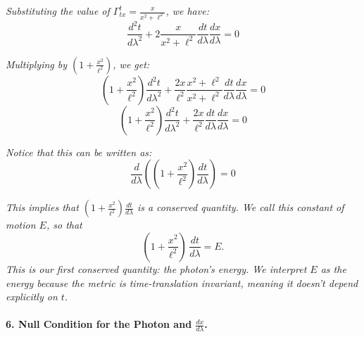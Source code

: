 \textit{Substituting the value of \(\Gamma^t_{tx} = \frac{x}{x^2 + \ell^2}\), we have:}
\[
\frac{d^2t}{d\lambda^2} + 2\frac{x}{x^2 + \ell^2} \frac{dt}{d\lambda} \frac{dx}{d\lambda} = 0
\]

\textit{Multiplying by \((1 + \frac{x^2}{\ell^2})\), we get:}
\[
(1 + \frac{x^2}{\ell^2}) \frac{d^2t}{d\lambda^2} + \frac{2x}{\ell^2} \frac{x^2 + \ell^2}{x^2+\ell^2} \frac{dt}{d\lambda} \frac{dx}{d\lambda} = 0
\]
\[
\left(1 + \frac{x^2}{\ell^2}\right) \frac{d^2 t}{d\lambda^2} + \frac{2x}{\ell^2} \frac{dt}{d\lambda}\frac{dx}{d\lambda} = 0
\]

\textit{Notice that this can be written as:}
\[
\frac{d}{d\lambda} \left( (1 + \frac{x^2}{\ell^2}) \frac{dt}{d\lambda} \right) = 0
\]



\textit{This implies that \((1 + \frac{x^2}{\ell^2}) \frac{dt}{d\lambda}\) is a conserved quantity. We call this constant of motion \(E\), so that}
\begin{equation*}\label{eq:pt-const}
\left(1 + \frac{x^2}{\ell^2}\right)\,\frac{dt}{d\lambda} = E.
\end{equation*}
\textit{This is our first conserved quantity: the photon's energy. \emph{We interpret \(E\) as the energy because the metric is time-translation invariant, meaning it doesn't depend explicitly on \(t\).}}

\paragraph{6. Null Condition for the Photon and \(\frac{dx}{d\lambda}\).}

